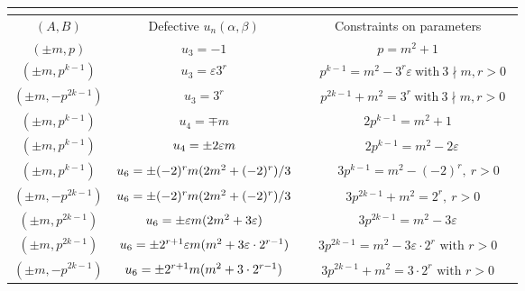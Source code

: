 \documentclass[12pt]{amsart}
\numberwithin{equation}{section}
\begin{document}
\begingroup
\setlength{\tabcolsep}{3pt} %
\renewcommand{\arraystretch}{2.5}
\begin{center} 
\begin{table}[!ht]
\begin{small}
\begin{tabular}{|c|c|c|}
\multicolumn{2}{c}{}\\ \hline
$(A,B)$ & Defective $u_n(\alpha, \beta)$ & Constraints on parameters \\ \hline \hline
$(\pm m, p)$ & $u_3 = -1$ & $p = m^2+1$ \\ \hline
$(\pm m, p^{k-1})$ &
$u_3 = \varepsilon 3^r$ &
$\begin{aligned} &p^{k-1}=m^2-3^r\varepsilon\ \text{with}\ 3\nmid m, r>0\end{aligned}$\\ \hline
$(\pm m, -p^{2k-1})$ &
$u_3 = 3^r$ &
$\begin{aligned} &p^{2k-1}+m^2=3^r\ \text{with}\ 3\nmid m, r>0\end{aligned}$\\ \hline
$(\pm m, p^{k-1})$ & $u_4 = \mp m$ & $2p^{k-1}=m^2+1$\\ \hline
$(\pm m, p^{k-1})$ & $u_4 = \pm 2{\color{black}\varepsilon}m$ & $\begin{aligned}\ \ \  2p^{k-1}=m^2-2\varepsilon
\end{aligned}$ \\ \hline

$(\pm m, p^{k-1})$ & 
$u_6 = {\color{black}\pm (-2)^rm(2m^2+(-2)^r)/3}$ &
$\begin{aligned}
&\ \ \ \ 3 p^{k-1}=m^2-(-2)^r,\ r>0
\end{aligned}$\\ \hline

$(\pm m, -p^{2k-1})$ & 
$u_6 = {\color{black}\pm (-2)^rm(2m^2+(-2)^r)/3}$ &
$\begin{aligned}
& 3p^{2k-1}+m^2=2^r,\ r>0
\end{aligned}$\\ \hline
$(\pm m, p^{2k-1})$ & ${\color{black}u_6=\pm \varepsilon m(2m^2+3\varepsilon)}$ & $3p^{2k-1}=m^2-3\varepsilon$\\ \hline
$(\pm m, p^{2k-1})$ & $u_6 = \pm 2^{r+1}{\color{black}\varepsilon} m(m^2 + 3 {\color{black}\varepsilon} \cdot 2^{r-1}) $ &$\begin{aligned} 3 p^{2k-1}=m^2-3\varepsilon\cdot 2^r
 \text{ with } r>0 \end{aligned}$ \\ \hline

 $(\pm m, -p^{2k-1})$ & $u_6 = \pm 2^{r+1}{\color{black}} m(m^2 + 3 {\color{black}} \cdot 2^{r-1}) $ &$\begin{aligned} 3 p^{2k-1}+m^2=3\cdot 2^r
 \text{ with } r>0 \end{aligned}$ \\ \hline

\end{tabular}
\end{small}
\medskip
{}
\label{table2}
\end{table}
\end{center}
\endgroup
\end{document}
